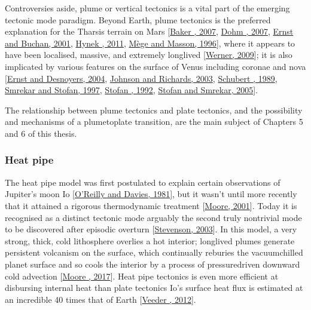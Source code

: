 \documentclass[letterpaper,10pt,english]{jupyterBook}
\begin{document}
\sphinxAtStartPar
Controversies aside, plume or vertical tectonics is a vital part of the emerging tectonic mode paradigm. Beyond Earth, plume tectonics is the preferred explanation for the Tharsis terrain on Mars {[}\hyperlink{cite.references:id566}{Baker , 2007}, \hyperlink{cite.references:id567}{Dohm , 2007}, \hyperlink{cite.references:id560}{Ernst and Buchan, 2001}, \hyperlink{cite.references:id568}{Hynek , 2011}, \hyperlink{cite.references:id550}{Mège and Masson, 1996}{]}, where it appears to have been localised, massive, and extremely long\sphinxhyphen{}lived {[}\hyperlink{cite.references:id192}{Werner, 2009}{]}; it is also implicated by various features on the surface of Venus including coronae and nova {[}\hyperlink{cite.references:id72}{Ernst and Desnoyers, 2004}, \hyperlink{cite.references:id564}{Johnson and Richards, 2003}, \hyperlink{cite.references:id563}{Schubert , 1989}, \hyperlink{cite.references:id565}{Smrekar and Stofan, 1997}, \hyperlink{cite.references:id562}{Stofan , 1992}, \hyperlink{cite.references:id561}{Stofan and Smrekar, 2005}{]}.

\sphinxAtStartPar
The relationship between plume tectonics and plate tectonics, and the possibility and mechanisms of a plume\sphinxhyphen{}to\sphinxhyphen{}plate transition, are the main subject of Chapters 5 and 6 of this thesis.


\subsubsection{Heat pipe}
\label{\detokenize{content/chapter_01_background/main:heat-pipe}}
\sphinxAtStartPar
The heat pipe model was first postulated to explain certain observations of Jupiter’s moon Io {[}\hyperlink{cite.references:id361}{O'Reilly and Davies, 1981}{]}, but it wasn’t until more recently that it attained a rigorous thermodynamic treatment {[}\hyperlink{cite.references:id605}{Moore, 2001}{]}. Today it is recognised as a distinct tectonic mode \sphinxhyphen{} arguably the second truly non\sphinxhyphen{}trivial mode to be discovered after episodic overturn {[}\hyperlink{cite.references:id270}{Stevenson, 2003}{]}. In this model, a very strong, thick, cold lithosphere overlies a hot interior; long\sphinxhyphen{}lived plumes generate persistent volcanism on the surface, which continually re\sphinxhyphen{}buries the vacuum\sphinxhyphen{}chilled planet surface and so cools the interior by a process of pressure\sphinxhyphen{}driven downward cold advection {[}\hyperlink{cite.references:id378}{Moore , 2017}{]}. Heat pipe tectonics is even more efficient at disbursing internal heat than plate tectonics \sphinxhyphen{} Io’s surface heat flux is estimated at an incredible 40 times that of Earth {[}\hyperlink{cite.references:id184}{Veeder , 2012}{]}.
\end{document}
